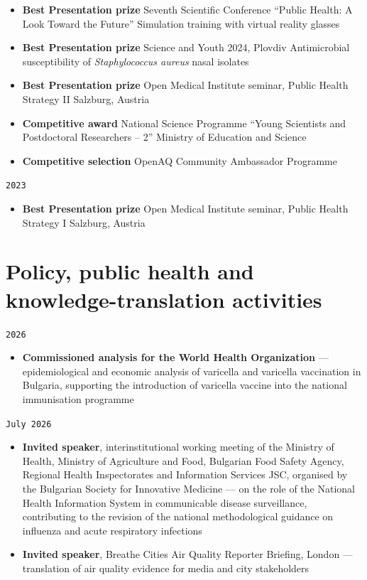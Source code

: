 \documentclass[
  10.5pt,
  a4paper,
  DIV=11,
  numbers=noendperiod]{scrartcl}
\providecommand{\tightlist}{%
  \setlength{\itemsep}{0pt}\setlength{\parskip}{0pt}}
\let\oldtexttt\texttt
\renewcommand{\texttt}[1]{{\color{cvbronze}\small\oldtexttt{#1}}}
\begin{document}
\begin{itemize}
\tightlist
\item
  \textbf{Best Presentation prize} \textbar{} Seventh Scientific
  Conference ``Public Health: A Look Toward the Future'' \textbar{}
  Simulation training with virtual reality glasses
\item
  \textbf{Best Presentation prize} \textbar{} Science and Youth 2024,
  Plovdiv \textbar{} Antimicrobial susceptibility of
  \emph{Staphylococcus aureus} nasal isolates
\item
  \textbf{Best Presentation prize} \textbar{} Open Medical Institute
  seminar, Public Health Strategy II \textbar{} Salzburg, Austria
\item
  \textbf{Competitive award} \textbar{} National Science Programme
  ``Young Scientists and Postdoctoral Researchers -- 2'' \textbar{}
  Ministry of Education and Science
\item
  \textbf{Competitive selection} \textbar{} OpenAQ Community Ambassador
  Programme
\end{itemize}

\texttt{2023}

\begin{itemize}
\tightlist
\item
  \textbf{Best Presentation prize} \textbar{} Open Medical Institute
  seminar, Public Health Strategy I \textbar{} Salzburg, Austria
\end{itemize}

\section{Policy, public health and knowledge-translation
activities}\label{policy-public-health-and-knowledge-translation-activities}

\texttt{2026}

\begin{itemize}
\tightlist
\item
  \textbf{Commissioned analysis for the World Health Organization} ---
  epidemiological and economic analysis of varicella and varicella
  vaccination in Bulgaria, supporting the introduction of varicella
  vaccine into the national immunisation programme
\end{itemize}

\texttt{July\ 2026}

\begin{itemize}
\tightlist
\item
  \textbf{Invited speaker}, interinstitutional working meeting of the
  Ministry of Health, Ministry of Agriculture and Food, Bulgarian Food
  Safety Agency, Regional Health Inspectorates and Information Services
  JSC, organised by the Bulgarian Society for Innovative Medicine --- on
  the role of the National Health Information System in communicable
  disease surveillance, contributing to the revision of the national
  methodological guidance on influenza and acute respiratory infections
\item
  \textbf{Invited speaker}, Breathe Cities Air Quality Reporter
  Briefing, London --- translation of air quality evidence for media and
  city stakeholders
\end{itemize}
\end{document}
